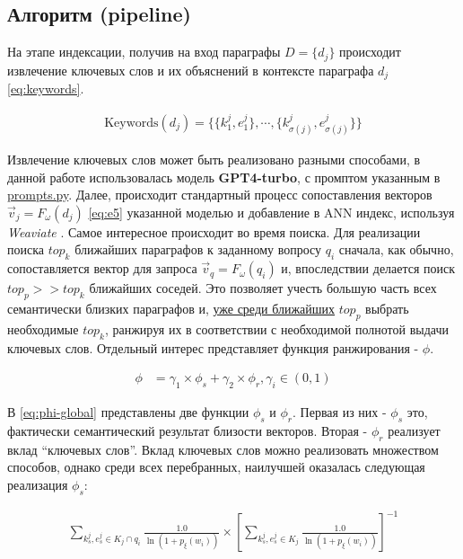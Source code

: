 \subsection{Алгоритм (pipeline)}\label{sec:algo}
На этапе индексации, получив на вход параграфы $D=\{d_j\}$ происходит извлечение ключевых слов и их объяснений в контексте параграфа $d_j$ \eqref{eq:keywords}.

\begin{align}
    \mathrm{Keywords}(d_j) = \{\{k^j_1, e^j_1\}, \cdots, \{k^j_{\sigma(j)}, e^j_{\sigma(j)}\}\}
    \label{eq:keywords}
\end{align}

Извлечение ключевых слов может быть реализовано разными способами, в данной работе использовалась модель \textbf{GPT4-turbo}, с промптом указанным в \href{https://github.com/atomicai/justatom/blob/86f405cf9c6b5bd5cf484636e4d4dcbd10ec0ca1/justatom/running/prompt.py#L16}{prompts.py}. Далее, 
происходит стандартный процесс сопоставления векторов $\vec{v}_j = F_{\omega}(d_j)$ \eqref{eq:e5} указанной моделью и добавление в ANN индекс, используя \textit{Weaviate} \cite{weaviate}.
Самое интересное происходит во время поиска. Для реализации поиска $top_k$ ближайших параграфов к заданному вопросу $q_i$ сначала, как обычно, 
сопоставляется вектор для запроса $\vec{v}_q=F_{\omega}(q_i)$ и, впоследствии делается поиск $top_p >> top_k$ ближайших соседей. Это позволяет учесть большую часть 
всех семантически близких параграфов и, \underline{уже среди ближайших} $top_p$ выбрать необходимые $top_k$, ранжируя их в соответствии с необходимой полнотой выдачи ключевых слов. Отдельный интерес 
представляет функция ранжирования - $\phi$. 

\begin{align}
    \phi& = \gamma_1 \times \phi_s + \gamma_2 \times \phi_r, \gamma_i \in (0, 1)
    \label{eq:phi-global}
\end{align}

В \eqref{eq:phi-global} представлены две функции $\phi_s$ и $\phi_r$. Первая из них - $\phi_s$ это, фактически семантический результат близости векторов. Вторая - 
$\phi_r$ реализует вклад ``ключевых слов''. Вклад ключевых слов можно реализовать множеством способов, однако среди всех перебранных, наилучшей оказалась следующая реализация $\phi_s$:

\begin{small}
\begin{align}
    \sum_{k^j_s, e^j_s \in K_j \cap q_i} \frac{1.0}{\ln(1 + p_{\xi}(w_i))} \times [\sum_{k^j_s, e^j_s \in K_j} \frac{1.0}{\ln(1 + p_{\xi}(w_i))}]^{-1}
\end{align}
\label{eq:idfrecall}
\end{small}

